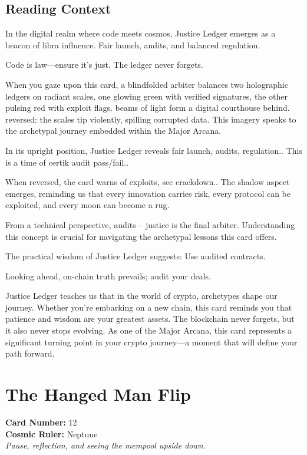 \documentclass[11pt,oneside]{book}
\begin{document}
\begin{minipage}[t]{0.55\textwidth}
  \subsection*{Reading Context}
  In the digital realm where code meets cosmos, Justice Ledger emerges as a beacon of libra influence. Fair launch, audits, and balanced regulation.

  Code is law—ensure it's just. The ledger never forgets.

  When you gaze upon this card, a blindfolded arbiter balances two holographic ledgers on radiant scales, one glowing green with verified signatures, the other pulsing red with exploit flags. beams of light form a digital courthouse behind. reversed: the scales tip violently, spilling corrupted data. This imagery speaks to the archetypal journey embedded within the Major Arcana.

  In its upright position, Justice Ledger reveals fair launch, audits, regulation.. This is a time of certik audit pass/fail..

  When reversed, the card warns of exploits, sec crackdown.. The shadow aspect emerges, reminding us that every innovation carries risk, every protocol can be exploited, and every moon can become a rug.

  From a technical perspective, audits – justice is the final arbiter. Understanding this concept is crucial for navigating the archetypal lessons this card offers.

  The practical wisdom of Justice Ledger suggests: Use audited contracts.

  Looking ahead, on-chain truth prevails; audit your deals.

  Justice Ledger teaches us that in the world of crypto, archetypes shape our journey. Whether you're embarking on a new chain, this card reminds you that patience and wisdom are your greatest assets. The blockchain never forgets, but it also never stops evolving. As one of the Major Arcana, this card represents a significant turning point in your crypto journey—a moment that will define your path forward.

\end{minipage}

\newpage
\section*{The Hanged Man Flip}

\begin{minipage}[t]{0.55\textwidth}
  \vspace{0pt}
  \textbf{Card Number:} 12\\  \textbf{Cosmic Ruler:} Neptune\\  \textit{Pause, reflection, and seeing the mempool upside down.}
\end{minipage}
\end{document}

